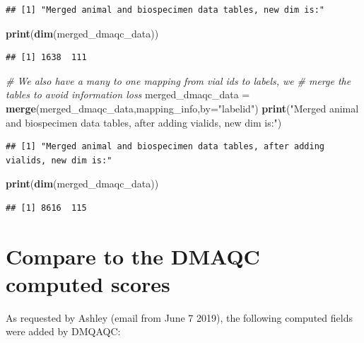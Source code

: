 \documentclass[]{article}
\newenvironment{Shaded}{\begin{snugshade}}{\end{snugshade}}
\newcommand{\KeywordTok}[1]{\textcolor[rgb]{0.13,0.29,0.53}{\textbf{#1}}}
\newcommand{\DataTypeTok}[1]{\textcolor[rgb]{0.13,0.29,0.53}{#1}}
\newcommand{\StringTok}[1]{\textcolor[rgb]{0.31,0.60,0.02}{#1}}
\newcommand{\CommentTok}[1]{\textcolor[rgb]{0.56,0.35,0.01}{\textit{#1}}}
\newcommand{\NormalTok}[1]{#1}
\begin{document}
\begin{verbatim}
## [1] "Merged animal and biospecimen data tables, new dim is:"
\end{verbatim}

\begin{Shaded}
\begin{Highlighting}[]
\KeywordTok{print}\NormalTok{(}\KeywordTok{dim}\NormalTok{(merged_dmaqc_data))}
\end{Highlighting}
\end{Shaded}

\begin{verbatim}
## [1] 1638  111
\end{verbatim}

\begin{Shaded}
\begin{Highlighting}[]
\CommentTok{# We also have a many to one mapping from vial ids to labels, we }
\CommentTok{# merge the tables to avoid information loss}
\NormalTok{merged_dmaqc_data =}\StringTok{ }\KeywordTok{merge}\NormalTok{(merged_dmaqc_data,mapping_info,}\DataTypeTok{by=}\StringTok{"labelid"}\NormalTok{)}
\KeywordTok{print}\NormalTok{(}\StringTok{"Merged animal and biospecimen data tables, after adding vialids, new dim is:"}\NormalTok{)}
\end{Highlighting}
\end{Shaded}

\begin{verbatim}
## [1] "Merged animal and biospecimen data tables, after adding vialids, new dim is:"
\end{verbatim}

\begin{Shaded}
\begin{Highlighting}[]
\KeywordTok{print}\NormalTok{(}\KeywordTok{dim}\NormalTok{(merged_dmaqc_data))}
\end{Highlighting}
\end{Shaded}

\begin{verbatim}
## [1] 8616  115
\end{verbatim}

\section{Compare to the DMAQC computed
scores}\label{compare-to-the-dmaqc-computed-scores}

As requested by Ashley (email from June 7 2019), the following computed
fields were added by DMQAQC:
\end{document}
